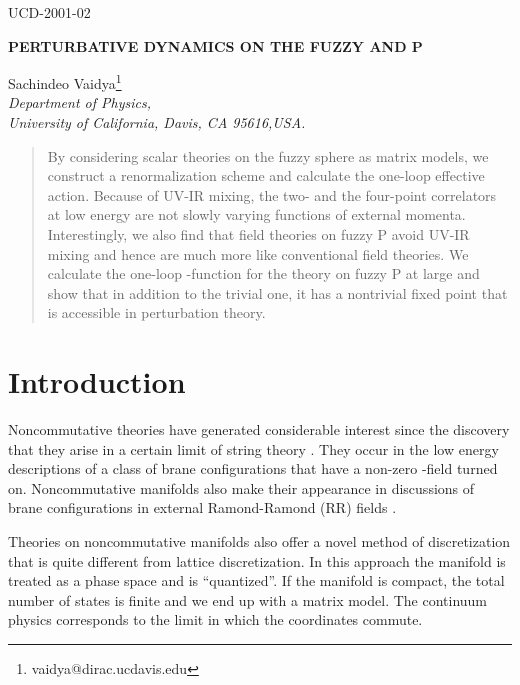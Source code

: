\documentclass[a4paper,12pt]{article}
\numberwithin{equation}{section}
\begin{document}
\begin{flushright}
UCD-2001-02\\
\end{flushright}
\begin{center}
{\large{\bf PERTURBATIVE DYNAMICS ON THE FUZZY \coordHE{} AND \coordHE{}P\coordHE{}}}
\bigskip 

Sachindeo Vaidya\footnote{vaidya@dirac.ucdavis.edu}\\ 
{\it Department of Physics, \\
University of California, Davis, CA 95616,USA.} \\

\end{center}

\begin{abstract}
By considering scalar theories on the fuzzy sphere as matrix models,
we construct a renormalization scheme and calculate the one-loop
effective action. Because of UV-IR mixing, the two- and the four-point
correlators at low energy are not slowly varying functions of external
momenta. Interestingly, we also find that field theories on fuzzy
\coordHE{}P\coordHE{} avoid UV-IR mixing and hence are much more like
conventional field theories. We calculate the one-loop
\myHighlight{$\beta$}\coordHE{}-function for the \coordHE{} theory on fuzzy \coordHE{}P\coordHE{} at
large \coordHE{} and show that in addition to the trivial one, it has a
nontrivial fixed point that is accessible in perturbation theory.
\end{abstract}

\section{Introduction}

Noncommutative theories have generated considerable interest since the
discovery that they arise in a certain limit of string theory
\cite{seiwitt}. They occur in the low energy descriptions of a class
of brane configurations that have a non-zero \coordHE{}-field turned
on. Noncommutative manifolds also make their appearance in discussions
of brane configurations in external Ramond-Ramond (RR) fields
\cite{myers}.

Theories on noncommutative manifolds also offer a novel method of
discretization that is quite different from lattice discretization. In
this approach the manifold \coordHE{} is treated as a phase space and
is ``quantized''. If the manifold is compact, the total number of
states is finite and we end up with a matrix model. The continuum
physics corresponds to the limit in which the coordinates commute. 
\end{document}

